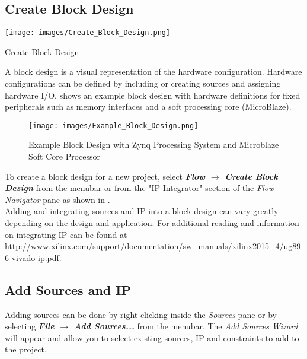 \subsection{Create Block Design}

\begin{marginfigure}
	\centering
	\texttt{[image: images/Create\_Block\_Design.png]}
	\caption[Create Block Design]{Create Block Design}
	\label{fig:createblockdesign}
\end{marginfigure}

A block design is a visual representation of the hardware configuration. Hardware configurations can be defined by including or creating sources and assigning hardware I/O.  shows an example block design with hardware definitions for fixed peripherals such as memory interfaces and a soft processing core (MicroBlaze). \\

\begin{figure}
	\centering
	\texttt{[image: images/Example\_Block\_Design.png]}
	\caption{Example Block Design with Zynq Processing System and Microblaze Soft Core Processor}
	\label{fig:exampleblockdesign}
\end{figure}

\noindent
To create a block design for a new project, select \textit{\bfseries Flow $\rightarrow$ Create Block Design} from the menubar or from the "IP Integrator" section of the \textit{Flow Navigator} pane as shown in . \\

\noindent
Adding and integrating sources and IP into a block design can vary greatly depending on the design and application. For additional reading and information on integrating IP can be found at \url{http://www.xilinx.com/support/documentation/sw_manuals/xilinx2015_4/ug896-vivado-ip.pdf}. 

\newpage

\subsection{Add Sources and IP}
\label{sub:addsources}

Adding sources can be done by right clicking inside the \textit{Sources} pane or by selecting \textit{\bfseries File $\rightarrow$ Add Sources...} from the menubar. The \textit{Add Sources Wizard} will appear and allow you to select existing sources, IP and constraints to add to the project. \\


